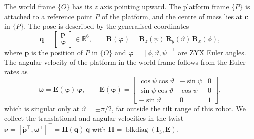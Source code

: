 \documentclass[10pt]{article}
\newcommand{\vc}[1]{\bm{#1}}
\newcommand{\mt}[1]{\mathbf{#1}}
\newcommand{\eye}{\mt{I}}
\begin{document}
The world frame $\{O\}$ has its $z$ axis pointing upward. The platform frame $\{P\}$ is attached to a reference point $P$ of the platform, and the centre of mass lies at $\vc{c}$ in $\{P\}$. The pose is described by the generalised coordinates
\begin{equation}
\vc{q}=\begin{bmatrix}\vc{p}\\ \vc{\varphi}\end{bmatrix}\in\mathbb{R}^{6},\qquad
\mt{R}(\vc\varphi)=\mt{R}_z(\psi)\,\mt{R}_y(\vartheta)\,\mt{R}_x(\phi),
\end{equation}
where $\vc{p}$ is the position of $P$ in $\{O\}$ and $\vc\varphi=[\phi,\vartheta,\psi]^\top$ are ZYX Euler angles. The angular velocity of the platform in the world frame follows from the Euler rates as
\begin{equation}\label{eq:E}
\vc\omega=\mt{E}(\vc\varphi)\,\dot{\vc\varphi},\qquad
\mt{E}(\vc\varphi)=\begin{bmatrix}\cos\psi\cos\vartheta & -\sin\psi & 0\\ \sin\psi\cos\vartheta & \cos\psi & 0\\ -\sin\vartheta & 0 & 1\end{bmatrix},
\end{equation}
which is singular only at $\vartheta=\pm\pi/2$, far outside the tilt range of this robot. We collect the translational and angular velocities in the twist $\vc\nu=[\dot{\vc p}^\top,\vc\omega^\top]^\top=\mt{H}(\vc q)\,\dot{\vc q}$ with $\mt{H}=\operatorname{blkdiag}(\eye_3,\mt E)$.
\end{document}
